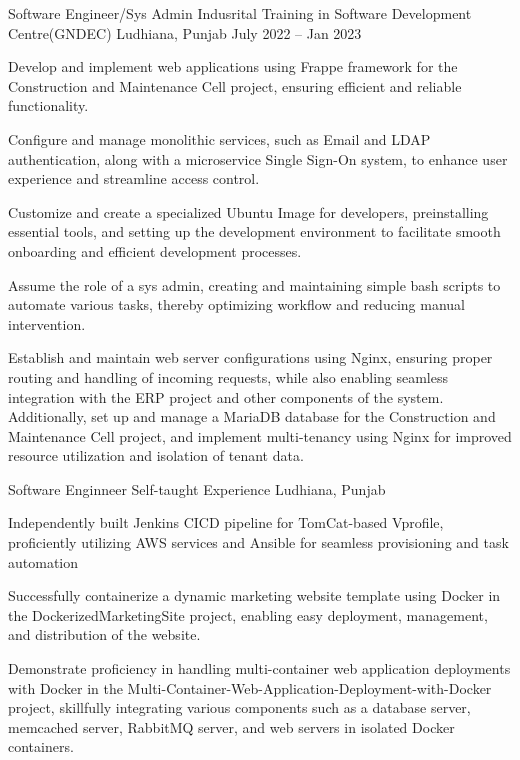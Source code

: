 \documentclass[]{awesome-cv}
\begin{document}
\vspace{-2mm}
\begin{cventries}
	\cventry
	{Software Engineer/Sys Admin}
	{Indusrital Training in Software Development Centre(GNDEC)}
	{Ludhiana, Punjab}
	{July 2022 – Jan 2023}
	{\begin{cvitems}
		\item {Develop and implement web applications using Frappe framework for the \textquotedbl{}Construction and Maintenance Cell\textquotedbl{} project, ensuring efficient and reliable functionality.}
		\item {Configure and manage monolithic services, such as Email and LDAP authentication, along with a microservice Single Sign-On system, to enhance user experience and streamline access control.}
		\item {Customize and create a specialized Ubuntu Image for developers, preinstalling essential tools, and setting up the development environment to facilitate smooth onboarding and efficient development processes.}
		\item {Assume the role of a sys admin, creating and maintaining simple bash scripts to automate various tasks, thereby optimizing workflow and reducing manual intervention.}
		\item {Establish and maintain web server configurations using Nginx, ensuring proper routing and handling of incoming requests, while also enabling seamless integration with the ERP project and other components of the system. Additionally, set up and manage a MariaDB database for the \textquotedbl{}Construction and Maintenance Cell\textquotedbl{} project, and implement multi-tenancy using Nginx for improved resource utilization and isolation of tenant data.}
		\end{cvitems}}
	\cventry
	{Software Enginneer}
	{Self-taught Experience}
	{Ludhiana, Punjab}
	{}
	{\begin{cvitems}
		\item {Independently built Jenkins CICD pipeline for TomCat-based Vprofile, proficiently utilizing AWS services and Ansible for seamless provisioning and task automation}
		\item {Successfully containerize a dynamic marketing website template using Docker in the DockerizedMarketingSite project, enabling easy deployment, management, and distribution of the website.}
		\item {Demonstrate proficiency in handling multi-container web application deployments with Docker in the \textquotedbl{}Multi-Container-Web-Application-Deployment-with-Docker\textquotedbl{} project, skillfully integrating various components such as a database server, memcached server, RabbitMQ server, and web servers in isolated Docker containers.}

\end{cvitems}}
\end{cventries}
\end{document}
